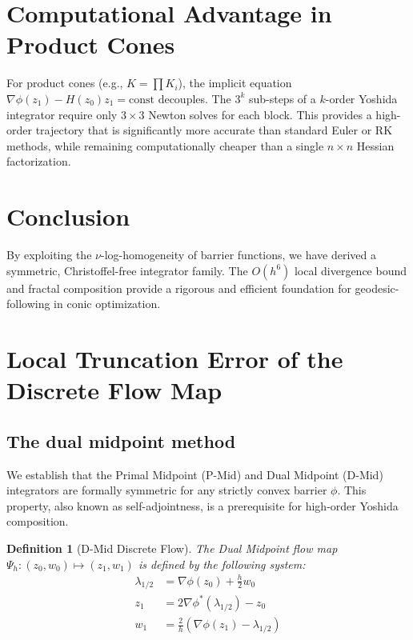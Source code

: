 \documentclass[11pt,a4paper]{article}
\newtheorem{definition}{Definition}
\begin{document}
\section{Computational Advantage in Product Cones}
For product cones (e.g., $K = \prod K_i$), the implicit equation $\nabla \phi(z_1) - H(z_0)z_1 = \text{const}$ decouples. The $3^k$ sub-steps of a $k$-order Yoshida integrator require only $3 \times 3$ Newton solves for each block. This provides a high-order trajectory that is significantly more accurate than standard Euler or RK methods, while remaining computationally cheaper than a single $n \times n$ Hessian factorization.

\section{Conclusion}
By exploiting the $\nu$-log-homogeneity of barrier functions, we have derived a symmetric, Christoffel-free integrator family. The $O(h^6)$ local divergence bound and fractal composition provide a rigorous and efficient foundation for geodesic-following in conic optimization.


\section{Local Truncation Error of the Discrete Flow Map}



\subsection{The dual midpoint method}

We establish that the Primal Midpoint (P-Mid) and Dual Midpoint (D-Mid) integrators are formally symmetric for any strictly convex barrier $\phi$. This property, also known as self-adjointness, is a prerequisite for high-order Yoshida composition.

\begin{definition}[D-Mid Discrete Flow]
The Dual Midpoint flow map $\Psi_h: (z_0, w_0) \mapsto (z_1, w_1)$ is defined by the following system:
\begin{align}
    \lambda_{1/2} &= \nabla \phi(z_0) + \frac{h}{2}w_0 \\
    z_1 &= 2\nabla \phi^*(\lambda_{1/2}) - z_0 \\
    w_1 &= \frac{2}{h}(\nabla \phi(z_1) - \lambda_{1/2})
\end{align}
\end{definition}
\end{document}
